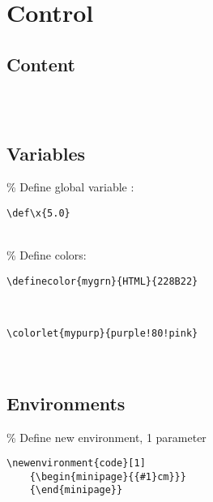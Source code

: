 \section{Control}

\subsection*{Content}
\begin{minipage}{6.0cm}
\begin{lstlisting}

\end{lstlisting}
\end{minipage} \\


\subsection*{Variables}
\% Define global variable : \\
\begin{code}{6.5}\begin{lstlisting}
\def\x{5.0}
\end{lstlisting}
\end{code} \\

\% Define colors: \\
\begin{code}{6.5}\begin{lstlisting}
\definecolor{mygrn}{HTML}{228B22}
\end{lstlisting}
\end{code} \\
\begin{code}{6.5}\begin{lstlisting}
\colorlet{mypurp}{purple!80!pink}
\end{lstlisting}
\end{code} \\

\subsection*{Environments}
\% Define new environment, 1 parameter
\begin{code}{6.5}\begin{lstlisting}
\newenvironment{code}[1]
    {\begin{minipage}{{#1}cm}}}
    {\end{minipage}}
\end{lstlisting}
\end{code} \\

